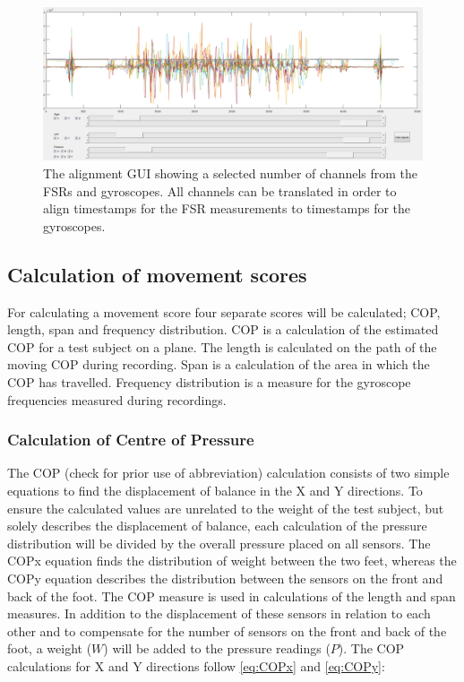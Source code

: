 \begin{figure}[H]
	\includegraphics[width=.6\textwidth]{figures/alignGUI}
	\caption{The alignment GUI showing a selected number of channels from the FSRs and gyroscopes. All channels can be translated in order to align timestamps for the FSR measurements to timestamps for the gyroscopes.}
	\label{fig:alignGUI}  %
\end{figure}


\subsection{Calculation of movement scores}

For calculating a movement score four separate scores will be calculated; COP, length, span and frequency distribution. COP is a calculation of the estimated COP for a test subject on a plane. The length is calculated on the path of the moving COP during recording. Span is a calculation of the area in which the COP has travelled. Frequency distribution is a measure for the gyroscope frequencies measured during recordings.

\subsubsection{Calculation of Centre of Pressure}
The COP (check for prior use of abbreviation) calculation consists of two simple equations to find the displacement of balance in the X and Y directions. To ensure the calculated values are unrelated to the weight of the test subject, but solely describes the displacement of balance, each calculation of the pressure distribution will be divided by the overall pressure placed on all sensors. The COP\lowercase{x} equation finds the distribution of weight between the two feet, whereas the COP\lowercase{y} equation describes the distribution between the sensors on the front and back of the foot. The COP measure is used in calculations of the length and span measures. In addition to the displacement of these sensors in relation to each other and to compensate for the number of sensors on the front and back of the foot, a weight ($W$) will be added to the pressure readings ($P$).
The COP calculations for X and Y directions follow \eqref{eq:COPx} and \eqref{eq:COPy}:

